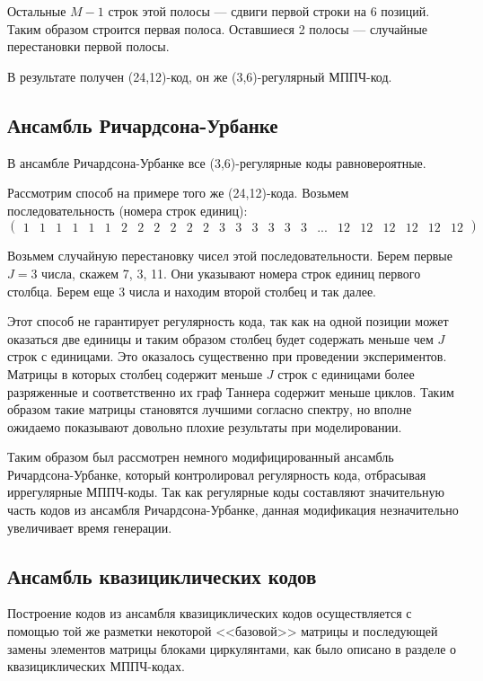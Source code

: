 Остальные $M-1$ строк этой полосы --- сдвиги первой строки на 6 позиций. Таким образом строится первая
полоса. Оставшиеся 2 полосы --- случайные перестановки первой полосы.

В результате получен (24,12)-код, он же (3,6)-регулярный МППЧ-код.

\subsection{Ансамбль Ричардсона-Урбанке}

В ансамбле Ричардсона-Урбанке все (3,6)-регулярные коды равновероятные.

Рассмотрим способ на примере того же (24,12)-кода.
Возьмем последовательность (номера строк единиц):
\[
\begin{pmatrix}
	1 & 1 & 1 & 1 & 1 & 1 & 2 & 2 & 2 & 2 & 2 & 2 & 3 & 3 & 3 & 3 & 3 & 3 & ... & 12 & 12 & 12 & 12 & 12 & 12
\end{pmatrix}
\]

Возьмем случайную перестановку чисел этой последовательности.
Берем первые $J=3$ числа, скажем 7, 3, 11. Они указывают номера строк единиц
первого столбца. Берем еще 3 числа и находим второй столбец и так далее.

Этот способ не гарантирует регулярность кода, так как на одной позиции может оказаться две единицы
и таким образом столбец будет содержать меньше чем $J$ строк с единицами. Это оказалось существенно при
проведении экспериментов. Матрицы в которых столбец содержит меньше $J$ строк с единицами
более разряженные и соответственно их граф Таннера содержит меньше циклов. Таким образом такие матрицы
становятся лучшими согласно спектру, но вполне ожидаемо показывают довольно плохие результаты при моделировании.

Таким образом был рассмотрен немного модифицированный ансамбль Ричардсона-Урбанке, который контролировал
регулярность кода, отбрасывая иррегулярные МППЧ-коды. Так как регулярные коды составляют значительную
часть кодов из ансамбля Ричардсона-Урбанке, данная модификация незначительно увеличивает время генерации.
\subsection{Ансамбль квазициклических кодов}

Построение кодов из ансамбля квазициклических кодов осуществляется с помощью той же разметки
некоторой <<базовой>> матрицы и последующей замены элементов матрицы блоками циркулянтами, как было
описано в разделе о квазициклических МППЧ-кодах.

